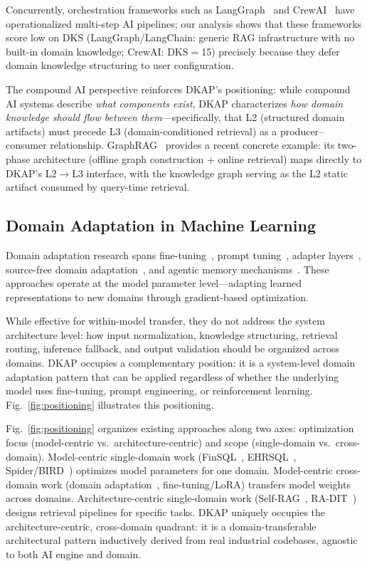 \documentclass[fleqn,10pt,lineno]{wlpeerj}
\begin{document}
Concurrently, orchestration frameworks such as LangGraph~\citep{chase2025langchain} and CrewAI~\citep{crewai} have operationalized multi-step AI pipelines; our analysis shows that these frameworks score low on DKS (LangGraph/LangChain: generic RAG infrastructure with no built-in domain knowledge; CrewAI: DKS$=$15) precisely because they defer domain knowledge structuring to user configuration.

The compound AI perspective reinforces DKAP's positioning: while compound AI systems describe \textit{what components exist}, DKAP characterizes \textit{how domain knowledge should flow between them}---specifically, that L2 (structured domain artifacts) must precede L3 (domain-conditioned retrieval) as a producer--consumer relationship. GraphRAG~\citep{graphrag} provides a recent concrete example: its two-phase architecture (offline graph construction + online retrieval) maps directly to DKAP's L2$\to$L3 interface, with the knowledge graph serving as the L2 static artifact consumed by query-time retrieval.

\subsection{Domain Adaptation in Machine Learning}

Domain adaptation research spans fine-tuning~\citep{howard2018ulmfit}, prompt tuning~\citep{lester2021prompt}, adapter layers~\citep{houlsby2019adapter}, source-free domain adaptation~\citep{liang2020sourcefree}, and agentic memory mechanisms~\citep{zhang2024agentic}. These approaches operate at the model parameter level---adapting learned representations to new domains through gradient-based optimization.

While effective for within-model transfer, they do not address the system architecture level: how input normalization, knowledge structuring, retrieval routing, inference fallback, and output validation should be organized across domains. DKAP occupies a complementary position: it is a system-level domain adaptation pattern that can be applied regardless of whether the underlying model uses fine-tuning, prompt engineering, or reinforcement learning. Fig.~\ref{fig:positioning} illustrates this positioning.

Fig.~\ref{fig:positioning} organizes existing approaches along two axes: optimization focus (model-centric vs.\ architecture-centric) and scope (single-domain vs.\ cross-domain). Model-centric single-domain work (FinSQL~\citep{finsql}, EHRSQL~\citep{ehrsql}, Spider/BIRD~\citep{spider,bird}) optimizes model parameters for one domain. Model-centric cross-domain work (domain adaptation~\citep{wang2018domain}, fine-tuning/LoRA) transfers model weights across domains. Architecture-centric single-domain work (Self-RAG~\citep{selfrag}, RA-DIT~\citep{radit}) designs retrieval pipelines for specific tasks. DKAP uniquely occupies the architecture-centric, cross-domain quadrant: it is a domain-transferable architectural pattern inductively derived from real industrial codebases, agnostic to both AI engine and domain.
\end{document}
